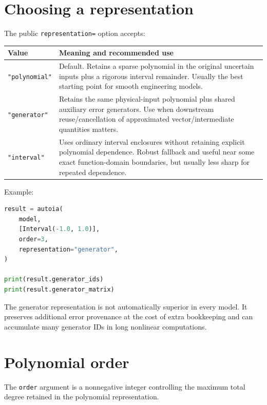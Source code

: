 \documentclass[11pt]{article}
\begin{document}
\section{Choosing a representation}

The public \texttt{representation=} option accepts:

\begin{longtable}{p{}p{}}
\toprule
Value & Meaning and recommended use \\
\midrule
\endhead
\texttt{"polynomial"} & Default.  Retains a sparse polynomial in the original uncertain inputs plus a rigorous interval remainder.  Usually the best starting point for smooth engineering models. \\
\texttt{"generator"} & Retains the same physical-input polynomial plus shared auxiliary error generators.  Use when downstream reuse/cancellation of approximated vector/intermediate quantities matters. \\
\texttt{"interval"} & Uses ordinary interval enclosures without retaining explicit polynomial dependence.  Robust fallback and useful near some exact function-domain boundaries, but usually less sharp for repeated dependence. \\
\bottomrule
\end{longtable}

Example:
\begin{lstlisting}[language=Python]
result = autoia(
    model,
    [Interval(-1.0, 1.0)],
    order=3,
    representation="generator",
)

print(result.generator_ids)
print(result.generator_matrix)
\end{lstlisting}

The generator representation is not automatically superior in every model.  It
preserves additional error provenance at the cost of extra bookkeeping and can
accumulate many generator IDs in long nonlinear computations.

\section{Polynomial order}

The \texttt{order} argument is a nonnegative integer controlling the maximum
total degree retained in the polynomial representation.
\end{document}
